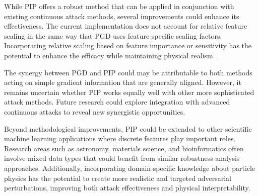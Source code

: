 \newpage

While PIP offers a robust method that can be applied in conjunction with existing continuous attack methods, several improvements could enhance its effectiveness. The current implementation does not account for relative feature scaling in the same way that PGD uses feature-specific scaling factors. Incorporating relative scaling based on feature importance or sensitivity has the potential to enhance the efficacy while maintaining physical realism.

The synergy between PGD and PIP could may be attributable to both methods acting on simple gradient information that are generally aligned. However, it remains uncertain whether PIP works equally well with other more sophisticated attack methods. Future research could explore integration with advanced continuous attacks to reveal new synergistic opportunities.

Beyond methodological improvements, PIP could be extended to other scientific machine learning applications where discrete features play important roles. Research areas such as astronomy, materials science, and bioinformatics often involve mixed data types that could benefit from similar robustness analysis approaches. Additionally, incorporating domain-specific knowledge about particle physics has the potential to create more realistic and targeted adversarial perturbations, improving both attack effectiveness and physical interpretability.